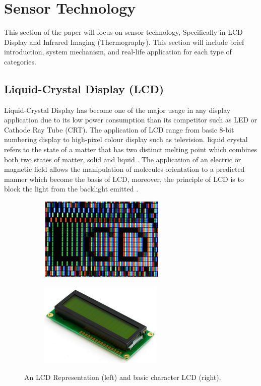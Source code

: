 \justifying
\noindent

\section{Sensor Technology}
This section of the paper will focus on sensor technology, Specifically in LCD Display and Infrared Imaging (Thermography). This section will include brief introduction, system mechanism, and real-life application for each type of categories. \\

\subsection{Liquid-Crystal Display (LCD)}
\noindent Liquid-Crystal Display has become one of the major usage in any display application due to its low power consumption than its competitor such as LED or Cathode Ray Tube (CRT). The application of LCD range from basic 8-bit numbering display to high-pixel colour display such as television. liquid crystal refers to the state of a matter that has two distinct melting point which combines both two states of matter, solid and liquid \cite{AnonymousLCDApplications}\cite{Gurski2005DisplayOverview}. The application of an electric or magnetic field allows the manipulation of molecules orientation to a predicted manner which become the basis of LCD, moreover, the principle of LCD is to block the light from the backlight emitted \cite{Gurski2005DisplayOverview}.\\

\begin{figure}[!ht]
\begin{center}
%    
  \begin{subfigure}[b]{0.4\textwidth}
    \includegraphics[height=4cm]{Figures/LCD_general.PNG}
  \end{subfigure}
  \begin{subfigure}[b]{0.35\textwidth}
    \includegraphics[height=4cm]{Figures/LCD_BASIC.jpg}
  \end{subfigure}
%  
  \caption{An LCD Representation \cite{Gurski2005DisplayOverview} (left) and basic character LCD \cite{AnonymousBasicSystems} (right).}
    \label{fig:basic lcd}
\end{center}
\end{figure}


